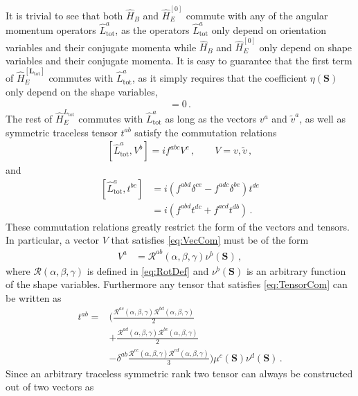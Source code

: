 \documentclass[reprint,superscriptaddress,pra,nofootinbib,preprintnumbers,floatfix]{revtex4-1}
\providecommand{\CR}{\mathcal{R}}
\begin{document}
It is trivial to see that both $\hat H_B$ and $\hat H^{[0]}_E$ commute with any of the angular momentum operators $\hat L_\text{tot}^a$, as the operators $\hat L_\text{tot}^a$ only depend on orientation variables and their conjugate momenta while $\hat H_B$ and $\hat H^{[0]}_E$ only depend on shape variables and their conjugate momenta. 
%
It is easy to guarantee that the first term of $\hat H_E^{[\bm L_\text{tot}]}$ commutes with $\hat L_\text{tot}^a$, as it simply requires that the coefficient $\eta(\bm S)$ only depend on the shape variables,
%
\begin{align}
[\hat L_\text{tot}^a, \eta(\bm S)] = 0 \, .
\end{align}
%
The rest of  $\hat H_E^{ L_\text{tot}}$ commutes with $\hat L_\text{tot}^a$ as long as the vectors $v^a$ and $\tilde{v}^a$, as well as symmetric traceless tensor $t^{ab}$ satisfy the commutation relations
%
\begin{align}
\left[\hat L_\text{tot}^a, V^b\right] = i f^{abc}V^c\, , \qquad V = v, \tilde v
\,,
\label{eq:VecCom}
\end{align}
%
and
%
\begin{align}
\left[\hat L_\text{tot}^a,t^{bc}\right] & = i \left(f^{abd}\delta^{c e} - f^{ad c}\delta^{be}\right)t^{d e} \nonumber\\
&=i \left(f^{abd}t^{dc} + f^{acd}t^{db}\right)
\,.
\label{eq:TensorCom}
\end{align}
%
These commutation relations greatly restrict the form of the vectors and tensors. 
%
In particular, a vector $V$ that satisfies \cref{eq:VecCom} must be of the form
%
\begin{align}
V^a &= \CR^{ab} (\alpha, \beta, \gamma) \nu^b (\bm S) 
\,,
\label{eq:VecGen}
\end{align}
%
where $\CR (\alpha, \beta, \gamma)$ is defined in \cref{eq:RotDef} and $\nu^b(\bm S)$ is an arbitrary function of the shape variables. Furthermore any tensor that satisfies \cref{eq:TensorCom} can be written as
\begin{align}
t^{ab}=&\Bigg(\frac{\CR^{ac}(\alpha, \beta, \gamma)\CR^{bd}(\alpha, \beta, \gamma)}{2}\nonumber\\
&+\frac{\CR^{ad}(\alpha, \beta, \gamma)\CR^{bc}(\alpha, \beta, \gamma)}{2}
\nonumber\\
&- \delta^{ab}\frac{\CR^{ec}(\alpha, \beta, \gamma)\CR^{ed}(\alpha, \beta, \gamma)}{3}\Bigg)\mu^c (\bm S) \nu^d (\bm S)\, .\nonumber
\end{align}
Since an arbitrary traceless symmetric rank two tensor can always be constructed out of two vectors as
\end{document}
